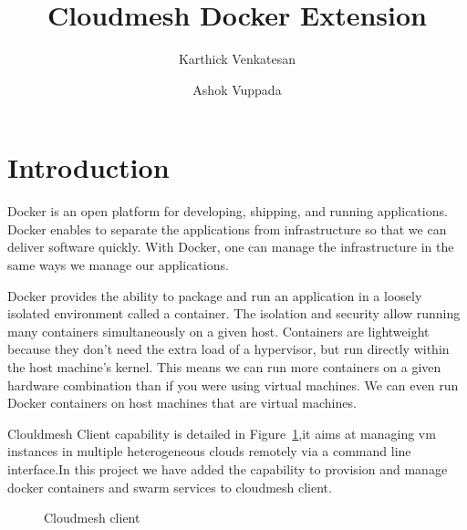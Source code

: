 \documentclass[9pt,twocolumn,twoside]{../../styles/osajnl}
\title{Cloudmesh Docker Extension}
\author[1]{Karthick Venkatesan}
\author[2]{Ashok Vuppada}
\affil[1]{School of Informatics and Computing, Bloomington, IN 47408, U.S.A.}
\begin{document}
\maketitle


\section{Introduction}
Docker is an open platform for developing, shipping, and running applications. Docker enables to separate the applications from infrastructure so that we can deliver software quickly. With Docker, one can manage the infrastructure in the same ways we manage our applications\cite{www-Docker}. 

Docker provides the ability to package and run an application in a loosely isolated environment called a container. The isolation and security allow running many containers simultaneously on a given host. Containers are lightweight because they don’t need the extra load of a hypervisor, but run directly within the host machine’s kernel. This means we can run more containers on a given hardware combination than if you were using virtual machines. We can even run Docker containers on host machines that are virtual machines.

Clouldmesh Client\cite{las14cloudmeshmultiple} capability is detailed in Figure~\ref{fig:cmvm},it aims at managing vm instances in multiple heterogeneous clouds remotely via a command line interface.In this project we have added the capability to provision and manage docker\cite{www-Docker} containers  and swarm\cite{www-Swarm} services to cloudmesh client\cite{las14cloudmeshmultiple}.

\begin{figure}[h!]
\centering
{}
\caption{Cloudmesh client }
\label{fig:cmvm}
\end{figure}
\end{document}
